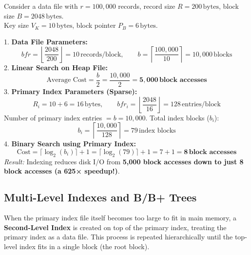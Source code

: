 \documentclass[11pt,a4paper]{article}
\newenvironment{Deriv}[1][Analysis \& Comparison]{\begin{tcolorbox}[derivbox, title=#1]}{\end{tcolorbox}}
\begin{document}
\begin{Deriv}[Search Cost Comparison: Unordered Heap vs. Primary Index]
Consider a data file with $r = 100,000$ records, record size $R = 200\,\text{bytes}$, block size $B = 2048\,\text{bytes}$.\\
Key size $V_K = 10\,\text{bytes}$, block pointer $P_B = 6\,\text{bytes}$.

1. \textbf{Data File Parameters:}
\begin{equation*}
  bfr = \left\lfloor \frac{2048}{200} \right\rfloor = 10\,\text{records/block}, \qquad b = \left\lceil \frac{100,000}{10} \right\rceil = 10,000\,\text{blocks}
\end{equation*}
2. \textbf{Linear Search on Heap File:}
\begin{equation*}
  \text{Average Cost} = \frac{b}{2} = \frac{10,000}{2} = \mathbf{5,000\,\text{block accesses}}
\end{equation*}
3. \textbf{Primary Index Parameters (Sparse):}
\begin{equation*}
  R_i = 10 + 6 = 16\,\text{bytes}, \qquad bfr_i = \left\lfloor \frac{2048}{16} \right\rfloor = 128\,\text{entries/block}
\end{equation*}
Number of primary index entries $= b = 10,000$. Total index blocks ($b_i$):
\begin{equation*}
  b_i = \left\lceil \frac{10,000}{128} \right\rceil = 79\,\text{index blocks}
\end{equation*}
4. \textbf{Binary Search using Primary Index:}
\begin{equation*}
  \text{Cost} = \lceil \log_2(b_i) \rceil + 1 = \lceil \log_2(79) \rceil + 1 = 7 + 1 = \mathbf{8\,\text{block accesses}}
\end{equation*}
\emph{Result:} Indexing reduces disk I/O from \textbf{5,000 block accesses down to just 8 block accesses (a 625× speedup!)}.
\end{Deriv}

\subsection{Multi-Level Indexes and B/B+ Trees}

When the primary index file itself becomes too large to fit in main memory, a \textbf{Second-Level Index} is created on top of the primary index, treating the primary index as a data file. This process is repeated hierarchically until the top-level index fits in a single block (the root block).
\end{document}
